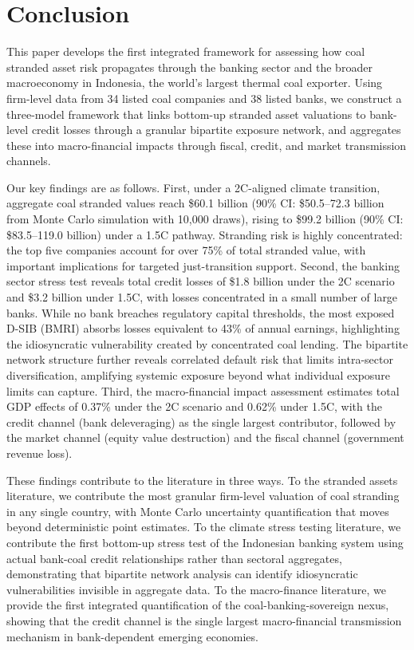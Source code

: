 
\section{Conclusion}
\label{sec:conclusion}

This paper develops the first integrated framework for assessing how coal stranded asset risk propagates through the banking sector and the broader macroeconomy in Indonesia, the world's largest thermal coal exporter. Using firm-level data from 34 listed coal companies and 38 listed banks, we construct a three-model framework that links bottom-up stranded asset valuations to bank-level credit losses through a granular bipartite exposure network, and aggregates these into macro-financial impacts through fiscal, credit, and market transmission channels.

Our key findings are as follows. First, under a 2\textdegree C-aligned climate transition, aggregate coal stranded values reach \$60.1 billion (90\% CI: \$50.5--72.3 billion from Monte Carlo simulation with 10,000 draws), rising to \$99.2 billion (90\% CI: \$83.5--119.0 billion) under a 1.5\textdegree C pathway. Stranding risk is highly concentrated: the top five companies account for over 75\% of total stranded value, with important implications for targeted just-transition support. Second, the banking sector stress test reveals total credit losses of \$1.8 billion under the 2\textdegree C scenario and \$3.2 billion under 1.5\textdegree C, with losses concentrated in a small number of large banks. While no bank breaches regulatory capital thresholds, the most exposed D-SIB (BMRI) absorbs losses equivalent to 43\% of annual earnings, highlighting the idiosyncratic vulnerability created by concentrated coal lending. The bipartite network structure further reveals correlated default risk that limits intra-sector diversification, amplifying systemic exposure beyond what individual exposure limits can capture. Third, the macro-financial impact assessment estimates total GDP effects of 0.37\% under the 2\textdegree C scenario and 0.62\% under 1.5\textdegree C, with the credit channel (bank deleveraging) as the single largest contributor, followed by the market channel (equity value destruction) and the fiscal channel (government revenue loss).

These findings contribute to the literature in three ways. To the stranded assets literature, we contribute the most granular firm-level valuation of coal stranding in any single country, with Monte Carlo uncertainty quantification that moves beyond deterministic point estimates. To the climate stress testing literature, we contribute the first bottom-up stress test of the Indonesian banking system using actual bank-coal credit relationships rather than sectoral aggregates, demonstrating that bipartite network analysis can identify idiosyncratic vulnerabilities invisible in aggregate data. To the macro-finance literature, we provide the first integrated quantification of the coal-banking-sovereign nexus, showing that the credit channel is the single largest macro-financial transmission mechanism in bank-dependent emerging economies.


